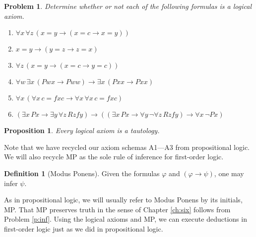\documentclass[12pt]{amsbook}
\theoremstyle{plain}
\newtheorem{prop}[thm]{Proposition}
\newtheorem{prob}[thm]{Problem}
\theoremstyle{definition}
\newtheorem{defn}{Definition}[chapter]
\theoremstyle{remark}
\begin{document}
\begin{prob} \label{p:seven3}
Determine whether or not each of the following formulas is a logical axiom.
\begin{enumerate}
\item $\forall x\, \forall z\, (x = y \to (x = c \to x = y))$
\item $x = y \to (y = z \to z = x)$
\item $\forall z\, (x = y \to (x = c \to y = c))$
\item $\forall w\, \exists x\, (Pwx \to Pww) \to \exists x\, (Pxx \to Pxx)$
\item $\forall x\, (\forall x\, c = fxc \to \forall x\, \forall x\, c = fxc)$
\item $(\exists x\, Px \to \exists y\, \forall z\, Rzfy) \to ( (\exists x\, Px \to \forall y\, \lnot \forall z\, Rzfy) \to \forall x\, \lnot Px)$
\end{enumerate}
\end{prob}

\begin{prop} \label{p:seven4}
Every logical axiom is a tautology.
\end{prop}

Note that we have recycled our axiom schemas A1---A3 from propositional logic.  We will also recycle MP as the sole rule of inference for first-order logic.  

\begin{defn}[Modus Ponens] 
Given the formulas $\varphi$ and $(\varphi \to \psi)$,  one may infer $\psi$.
\end{defn}

As in propositional logic,  we will usually refer to Modus Ponens by its initials,  MP.  That MP preserves truth in the sense of Chapter \ref{ch:six} follows from Problem \ref{p:inf}.  Using the logical axioms and MP,  we can execute deductions in first-order logic just as we did in propositional logic.
\end{document}
